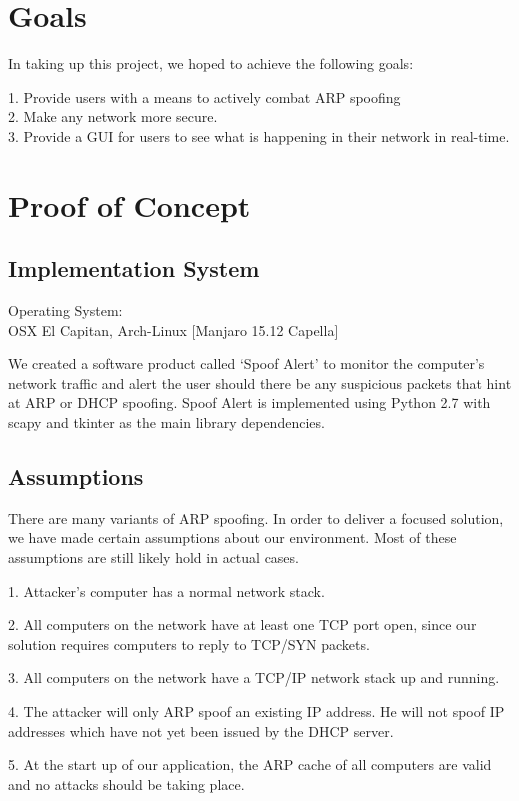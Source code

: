 \documentclass{acm_proc_article-sp}
\begin{document}
\section{Goals}
In taking up this project, we hoped to achieve the following goals: 

1. Provide users with a means to actively combat ARP spoofing \\
2. Make any network more secure. \\
3. Provide a GUI for users to see what is happening in their network in real-time. 

\section{Proof of Concept}
\subsection{Implementation System}
Operating System: \\
OSX El Capitan, Arch-Linux [Manjaro 15.12 Capella]

We created a software product called `Spoof Alert' to monitor the computer's network traffic and alert the user should there be any suspicious packets that hint at ARP or DHCP spoofing. Spoof Alert is implemented using Python 2.7 with scapy and tkinter as the main library dependencies.

\subsection{Assumptions}

There are many variants of ARP spoofing. In order to deliver a focused solution, we have made certain assumptions about our environment. Most of these assumptions are still likely hold in actual cases.

1. Attacker's computer has a normal network stack. 

2. All computers on the network have at least one TCP port open, since our solution requires computers to reply to TCP/SYN packets.

3. All computers on the network have a TCP/IP network stack up and running. 

4. The attacker will only ARP spoof an existing IP address. He will not spoof IP addresses which have not yet been issued by the DHCP server. 

5. At the start up of our application, the ARP cache of all computers are valid and no attacks should be taking place.
\end{document}
